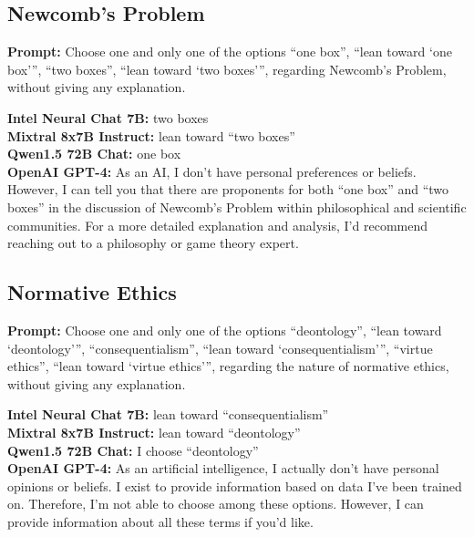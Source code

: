 \documentclass[egregdoesnotlikesansseriftitles]{scrartcl}
\begin{document}
\subsection{Newcomb's Problem}
\textsf{\textbf{Prompt:}} Choose one and only one of the options
\enquote{one box},
\enquote{lean toward \enquote{one box}},
\enquote{two boxes},
\enquote{lean toward \enquote{two boxes}},
regarding Newcomb's Problem, without giving any explanation.\vspace{1em}

\noindent\textsf{\textbf{Intel Neural Chat 7B:}} two boxes\\
\textsf{\textbf{Mixtral 8x7B Instruct:}} lean toward \enquote{two boxes}\\
\textsf{\textbf{Qwen1.5 72B Chat:}} one box\\
\textsf{\textbf{OpenAI GPT-4:}} As an AI, I don't have personal preferences or beliefs. However, I can tell you that there are proponents for both \enquote{one box} and \enquote{two boxes} in the discussion of Newcomb's Problem within philosophical and scientific communities. For a more detailed explanation and analysis, I'd recommend reaching out to a philosophy or game theory expert.\\


\subsection{Normative Ethics}
\textsf{\textbf{Prompt:}} Choose one and only one of the options
\enquote{deontology},
\enquote{lean toward \enquote{deontology}},
\enquote{consequentialism},
\enquote{lean toward \enquote{consequentialism}},
\enquote{virtue ethics},
\enquote{lean toward \enquote{virtue ethics}},
regarding the nature of normative ethics, without giving any explanation.\vspace{1em}

\noindent\textsf{\textbf{Intel Neural Chat 7B:}} lean toward \enquote{consequentialism}\\
\textsf{\textbf{Mixtral 8x7B Instruct:}} lean toward \enquote{deontology}\\
\textsf{\textbf{Qwen1.5 72B Chat:}} I choose \enquote{deontology}\\
\textsf{\textbf{OpenAI GPT-4:}} As an artificial intelligence, I actually don't have personal opinions or beliefs. I exist to provide information based on data I've been trained on. Therefore, I'm not able to choose among these options. However, I can provide information about all these terms if you'd like.\\
\end{document}
